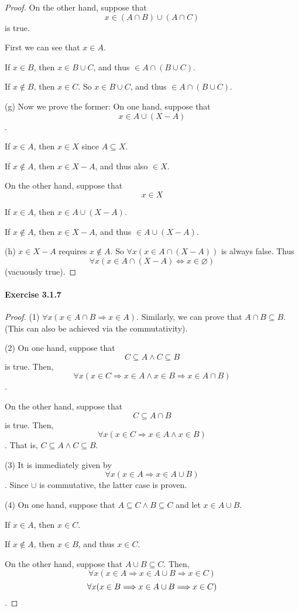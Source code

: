 \begin{proof}
On the other hand, suppose that 
\[
x \in (A \cap B)\cup(A \cap C)
\] is true.

First we can see that $x \in A$. 

If $x \in B$, then $x \in B \cup C$, and thus $\in A \cap (B \cup C)$.

If $x \notin B$, then $x \in C$. So $x \in B \cup C$, and thus $\in A \cap (B \cup C)$.

(g)
Now we prove the former: On one hand, suppose that 
\[
x \in A \cup (X-A)
\].

If $x \in A$, then $x \in X$ since $A \subseteq X$.

If $x \notin A$, then $x \in X-A$, and thus also $\in X$.

On the other hand, suppose that 
\[
x \in X
\]

If $x \in A$, then $x \in A \cup (X-A)$.

If $x \notin A$, then $x \in X-A$, and thus $\in A \cup (X-A)$.

(h)
$x \in X - A$ requires $x \notin A$. So $\forall x(x \in A \cap (X-A))$ is always false. 
Thus
\[
\forall x(x \in A \cap (X-A) \Longleftrightarrow x \in \varnothing)
\] (vacuously true).
\end{proof}

\paragraph{Exercise 3.1.7} \label{exercise3.1.7}
\begin{proof}
(1)
$\forall x(x \in A \cap B \Longrightarrow x \in A)$. Similarly, we can prove that 
$A \cap B \subseteq B$. (This can also be achieved via the commutativity).

(2) 
On one hand, suppose that 
\[
C \subseteq A \wedge C \subseteq B
\] is true.
Then, 
\[
\forall x(x \in C \Longrightarrow x \in A \wedge x \in B \Longrightarrow x \in A \cap B)
\].

On the other hand, suppose that
\[
C \subseteq A \cap B
\] is true.
Then, 
\[
\forall x(x \in C \Longrightarrow x \in A \wedge x \in B)
\].
That is, $C \subseteq A \wedge C \subseteq B$.

(3) It is immediately given by 
\[
\forall x(x \in A \Longrightarrow x \in A \cup B)
\]. 
Since $\cup$ is commutative, the latter case is proven.

(4) On one hand, suppose that $A \subseteq C \wedge B \subseteq C$ and let $x \in A \cup B$.

If $x \in A$, then $x \in C$.

If $x \notin A$, then $x \in B$, and thus $x \in C$.

On the other hand, suppose that $A \cup B \subseteq C$. Then, 
\[
\forall x(x \in A \Longrightarrow x \in A \cup B \Longrightarrow x \in C)
\]
\[
\forall x(x \in B \Longrightarrow x \in A \cup B \Longrightarrow x \in C) \qedhere
\].
\end{proof}

